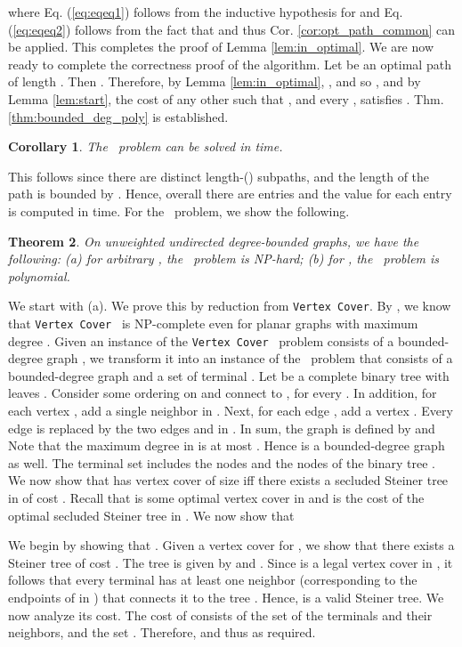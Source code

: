 \documentclass[12pt]{article}
\newtheorem{theorem}{Theorem}[section]
\newtheorem{corollary}[theorem]{Corollary}
\def\Proof{\par\noindent{\bf Proof:~}}
\newcommand{\PS}[0]{ 
}
\newcommand{\PP}[0]{ }
\newcommand{\VC}[0]{\mbox{\tt Vertex Cover}}
\begin{document}
where Eq. (\ref{eq:eqeq1}) follows from the inductive hypothesis for  and Eq. (\ref{eq:eqeq2}) follows from the fact that  and thus Cor. \ref{cor:opt_path_common} can be applied.
This completes the proof of Lemma \ref{lem:in_optimal}.
We are now ready to complete the correctness proof of the algorithm. Let  be an optimal  path of length . Then . Therefore, by Lemma \ref{lem:in_optimal}, , and so , and by Lemma \ref{lem:start}, the cost of any other  such that , and every , satisfies .  Thm. \ref{thm:bounded_deg_poly} is established.
\begin{corollary}
\label{cor:deg_pp}
The \PP\ problem can be solved in  time.
\end{corollary}
This follows since there are  distinct length-() subpaths, and the length of the path is bounded by . Hence, overall there are  entries and the value for each entry is computed in  time.
For the \PS\ problem, we show the following.
\begin{theorem}
\label{thm:steiner_bounded_deg_poly}
On unweighted undirected degree-bounded graphs, we have the following:
(a) for arbitrary , the \PS\ problem is NP-hard; (b) for , the \PS\ problem is \emph{polynomial}.
\end{theorem}
\Proof
We start with (a).
We prove this by reduction from \VC. By \cite{VCDeg3}, we know that \VC~ is NP-complete even for planar graphs with maximum degree .
Given an instance of the \VC~ problem consists of a bounded-degree graph , we transform it into an instance of  the \PS\ problem that consists of a bounded-degree graph  and a set of terminal . Let  be a complete binary tree with  leaves .
Consider some ordering on  and connect  to , for every . In addition, for each vertex , add a single neighbor  in . Next, for each edge , add a vertex . Every edge  is replaced by the two edges  and  in . In sum, the graph  is defined by  and  
Note that the maximum degree  in  is at most . Hence  is a bounded-degree graph as well.
The terminal set  includes the  nodes and the nodes of the binary tree . We now show that  has vertex cover of size  iff there exists a secluded Steiner tree  in  of cost . Recall that  is some optimal vertex cover in  and  is the cost of the optimal secluded Steiner tree in .
We now show that

We begin by showing that .
Given a vertex cover  for , we show that there exists a Steiner tree  of cost .
The tree  is given by 
and .
Since  is a legal vertex cover in , it follows that every terminal  has at least one neighbor  (corresponding to the endpoints of  in ) that connects it to the tree . Hence,  is a valid Steiner tree. We now analyze its cost. The cost of  consists of the set  of the terminals and their neighbors, and the set . Therefore,  and
thus  as required.
\end{document}

